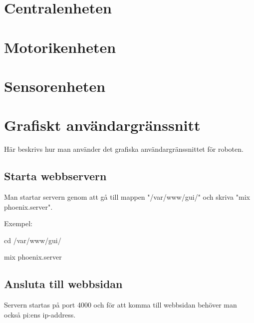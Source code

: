 \documentclass[a4paper,titlepage,12pt]{article}
\begin{document}
	
    \newpage
	\section{Centralenheten}
	

    \newpage
	\section{Motorikenheten}
	
	

	\section{Sensorenheten}

	

    \newpage
	\section{Grafiskt användargränssnitt}
	Här beskrivs hur man använder det grafiska användargränssnittet för roboten.
	
	\subsection{Starta webbservern}
	Man startar servern genom att gå till mappen "/var/www/gui/" och skriva "mix phoenix.server".
	
	Exempel:
	
	cd /var/www/gui/
	
	mix phoenix.server
	
	
	\subsection{Ansluta till webbsidan}
	Servern startas på port 4000 och för att komma till webbsidan behöver man också pi:ens ip-address. 
	
\end{document}
